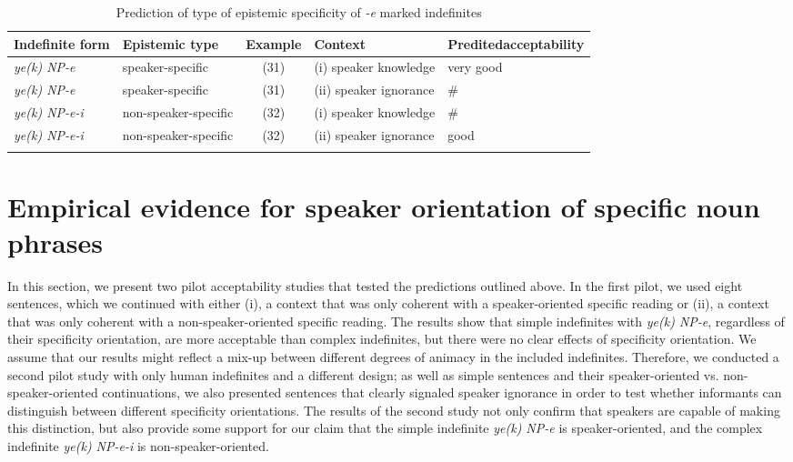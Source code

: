 \documentclass[output=paper]{langsci/langscibook}
\begin{document}
\begin{table}
{\small{
\begin{tabularx}{\textwidth}{Ql@{}clQ}
\lsptoprule
Indefinite form 		& Epistemic type 	& Example 	& Context 	& Predited\newline acceptability \\
\midrule
{\emph{ye(k) NP-e}}		& speaker-specific		& (31)	& {(i) speaker knowledge}	& very good \\
{\emph{ye(k) NP-e}}		& speaker-specific		& (31)	& {(ii) speaker ignorance}	& \# \\
{{\emph{ye(k) NP-e-i}}}	& {non-speaker-specific}	& (32)	& {(i) speaker knowledge}	& \# \\
{{\emph{ye(k) NP-e-i}}}	& {non-speaker-specific	}& (32)	& {(ii) speaker ignorance}	& good \\
\lspbottomrule
\end{tabularx}
}}
\caption{{Prediction of type of epistemic specificity of {\emph{-e}} marked indefinites}}\label{4table:6}
\end{table}



\section{Empirical evidence for speaker orientation of specific noun phrases}\label{4sec:5}

{
In this section, we present two pilot acceptability studies that tested the predictions outlined above. In the first pilot, we used eight sentences, which we continued with either (i), a context that was only coherent with a speaker-oriented specific reading or (ii), a context that was only coherent with a non-speaker-oriented specific reading. The results show that simple indefinites with {\emph{ye(k) NP-e}}, regardless of their specificity orientation, are more acceptable than complex indefinites, but there were no clear effects of specificity orientation. We assume that our results might reflect a mix-up between different degrees of animacy in the included indefinites. Therefore, we conducted a second pilot study with only human indefinites and a different design; as well as simple sentences and their speaker-oriented vs. non-speaker-oriented continuations, we also presented sentences that clearly signaled speaker ignorance in order to test whether informants can distinguish between different specificity orientations. The results of the second study not only confirm that speakers are capable of making this distinction, but also provide some support for our claim that the simple indefinite {\emph{ye(k) NP-e}} is speaker-oriented, and the complex indefinite {\emph{ye(k) NP-e-i}} is non-speaker-oriented.
}
\end{document}

